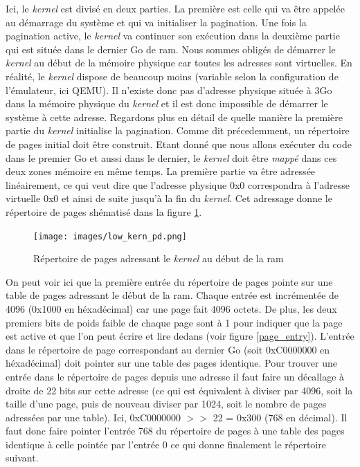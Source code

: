 \documentclass[a4paper, 12pt]{article}
\begin{document}
Ici, le \textit{kernel} est divisé en deux parties. La première est celle qui va
être appelée au démarrage du système et qui va initialiser la pagination. Une fois
la pagination active, le \textit{kernel} va continuer son exécution dans la deuxième
partie qui est située dans le dernier Go de \acrshort{ram}. Nous sommes obligés de
démarrer le \textit{kernel} au début de la mémoire physique car toutes les adresses
sont virtuelles. En réalité, le \textit{kernel} dispose de beaucoup moins (variable
selon la configuration de l'émulateur, ici QEMU). Il n'existe donc pas d'adresse
physique située à 3Go dans la mémoire physique du \textit{kernel} et il est donc
impossible de démarrer le système à cette adresse. Regardons plus en détail de quelle
manière la première partie du \textit{kernel} initialise la pagination. Comme dit
précedemment, un répertoire de pages initial doit être construit. Etant donné que
nous allons exécuter du code dans le premier Go et aussi dans le dernier, le \textit{kernel}
doit être \textit{mappé} dans ces deux zones mémoire en même temps. La première
partie va être adressée linéairement, ce qui veut dire que l'adresse physique
0x0 correspondra à l'adresse virtuelle 0x0 et ainsi de suite jusqu'à la fin du
\textit{kernel}. Cet adressage donne le répertoire de pages shématisé dans la figure
\ref{low_kern_pd}.

\begin{figure}[!h]
  \centering
  \texttt{[image: images/low\_kern\_pd.png]}
  \caption{Répertoire de pages adressant le \textit{kernel} au début de la \acrshort{ram}}
  \label{low_kern_pd}
\end{figure}

On peut voir ici que la première entrée du répertoire de pages pointe sur une
table de pages adressant le début de la \acrshort{ram}. Chaque entrée est incrémentée
de 4096 (0x1000 en héxadécimal) car une page fait 4096 octets. De plus, les deux
premiers bits de poids faible de chaque page sont à 1 pour indiquer que la page est
active et que l'on peut écrire et lire dedans (voir figure \ref{page_entry}). L'entrée
dans le répertoire de page correspondant au dernier Go (soit 0xC0000000 en héxadécimal)
doit pointer sur une table des pages identique. Pour trouver une entrée dans le
répertoire de pages depuis une adresse il faut faire un décallage à droite de 22
bits sur cette adresse (ce qui est équivalent à diviser par 4096, soit la taille
d'une page, puis de nouveau diviser par 1024, soit le nombre de pages adressées par
une table). Ici, 0xC0000000 $>>$ 22 = 0x300 (768 en décimal). Il faut donc faire
pointer l'entrée 768 du répertoire de pages à une table des pages identique à
celle pointée par l'entrée 0 ce qui donne finalement le répertoire suivant.
\end{document}
